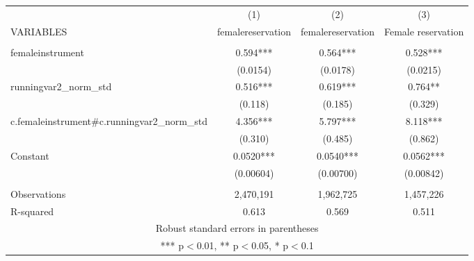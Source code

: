 \begin{tabular}{lccc} \hline
 & (1) & (2) & (3) \\
VARIABLES & femalereservation & femalereservation & Female reservation \\ \hline
 &  &  &  \\
femaleinstrument & 0.594*** & 0.564*** & 0.528*** \\
 & (0.0154) & (0.0178) & (0.0215) \\
runningvar2\_norm\_std & 0.516*** & 0.619*** & 0.764** \\
 & (0.118) & (0.185) & (0.329) \\
c.femaleinstrument\#c.runningvar2\_norm\_std & 4.356*** & 5.797*** & 8.118*** \\
 & (0.310) & (0.485) & (0.862) \\
Constant & 0.0520*** & 0.0540*** & 0.0562*** \\
 & (0.00604) & (0.00700) & (0.00842) \\
 &  &  &  \\
Observations & 2,470,191 & 1,962,725 & 1,457,226 \\
 R-squared & 0.613 & 0.569 & 0.511 \\ \hline
\multicolumn{4}{c}{ Robust standard errors in parentheses} \\
\multicolumn{4}{c}{ *** p$<$0.01, ** p$<$0.05, * p$<$0.1} \\
\end{tabular}
